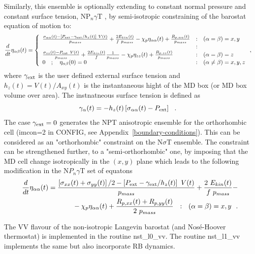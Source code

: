 Similarly, this ensemble is optionally extending to constant
normal pressure and constant surface tension, NP$_{n}\gamma$T
\cite{ikeguchi-04a}, by semi-isotropic constraining of the
barostat equation of motion to:
\begin{equation}
\frac{d}{dt} \eta_{\alpha\beta}(t) = \left\{ \begin{array} {l@{\quad:\quad}l}
\frac{\sigma_{\alpha\alpha}(t) - \left[ P_{\rm ext} - \gamma_{\rm ext} / h_{z}(t) \right]~V(t)}{p_{mass}} +
\frac{2 E_{kin}(t)}{f~p_{mass}} - \chi_{p} \eta_{\alpha\alpha}(t) +
\frac{R_{p,\alpha\alpha}(t)}{p_{mass}} & (\alpha = \beta) = x,y \\
& \\
\frac{\sigma_{zz}(t) - P_{\rm ext}~V(t)}{p_{mass}} +
\frac{2 E_{kin}(t)}{f} \frac{1}{p_{mass}} - \chi_{p} \eta_{zz}(t) +
\frac{R_{p,zz}(t)}{p_{mass}} & (\alpha = \beta) = z \\
0~~~;~~~\eta_{\alpha\beta}(0) = 0 & (\alpha \ne \beta) = x,y,z
\end{array} \right. ,
\end{equation}
where $\gamma_{\rm ext}$ is the user defined external surface tension
and $h_{z}(t) = V(t) / A_{xy}(t)$ is the instantaneous hight of the
MD box (or MD box volume over area).  The instnatneous surface
tension is defined as
\begin{equation}
\gamma_{\alpha}(t)=-h_{z}(t)\left[ \sigma_{\alpha\alpha}(t) - P_{\rm ext} \right]~~.\label{gamma}
\end{equation}
The case $\gamma_{\rm ext}=0$ generates the NPT anisotropic ensemble for
the orthorhombic cell (imcon=2 in CONFIG, see Appendix~\ref{boundary-conditions}).
This can be considered as an "orthorhombic" constraint on the N$\sigma$T ensemble.
The constraint can be strengthened further, to a "semi-orthorhombic" one, by
imposing that the MD cell change isotropically in the $(x,y)$ plane
which leads to the following modification in the N$P_{n}\gamma$T set of equatons
\begin{eqnarray}
\frac{d}{dt} \eta_{\alpha\alpha}(t) = \frac{\left[\sigma_{xx}(t)+\sigma_{yy}(t)\right]/2 -
\left[ P_{\rm ext} - \gamma_{\rm ext} / h_{z}(t) \right]~V(t)}{p_{mass}} +
\frac{2~E_{kin}(t)}{f~p_{mass}} - \\
\phantom{xxxxxxxxxxxxxx}- \chi_{p} \eta_{\alpha\alpha}(t) +
\frac{R_{p,xx}(t)+R_{p,yy}(t)}{2~p_{mass}}~~:~~(\alpha = \beta) = x,y~~.\nonumber
\end{eqnarray}

The VV flavour of the non-isotropic Langevin barostat
(and Nos\'{e}-Hoover thermostat) is implemented in the \D routine
{\sc nst\_l0\_vv}.
The routine
{\sc nst\_l1\_vv} implements the
same but also incorporate RB dynamics.

